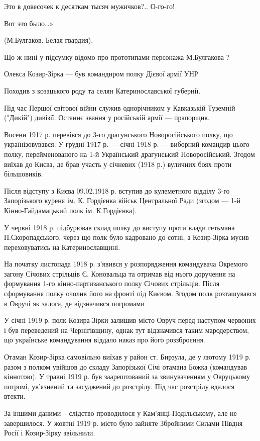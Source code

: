 Это в довесочек к десяткам тысяч мужичков?.. О-го-го!

Вот это было…»

(М.Булгаков. Белая гвардия).

Що ж нині у підсумку відомо про прототипами персонажа М.Булгакова ?

Олекса Козир-Зірка — був командиром полку Дієвої армії УНР.

Походив з козацького роду та селян Катеринославської губернії. 

Під час Першої світової війни служив однорічником у Кавказькій Туземній
("Дикій") дивізії. Останнє звання у російській армії — прапорщик.

Восени 1917 р. перевівся до 3-го драгунського Новоросійського полку, що
українізовувався. У грудні 1917 р. — січні 1918 р. — виборний командир цього
полку, перейменованого на 1-й Український драгунський Новоросійський. Згодом
виїхав до Києва, де брав участь у січневих (1918 р.) вуличних боях проти
більшовиків. 

Після відступу з Києва 09.02.1918 р. вступив до кулеметного відділу 3-го
Запорізького куреня ім. К. Гордієнка військ Центральної Ради (згодом — 1-й
Кінно-Гайдамацький полк ім. К.Гордієнка). 

У червні 1918 р. підбурював склад полку до виступу проти влади гетьмана
П.Скоропадського, через що полк було кадровано до сотні, а Козир-Зірка мусив
переховуватись на Катеринославщині. 

На початку листопада 1918 р. з'явився у розпорядження командувача Окремого
загону Січових стрільців Є. Коновальца та отримав від нього доручення на
формування 1-го кінно-партизанського полку Січових стрільців. Після
сформування полку очолив його на фронті під Києвом. Згодом полк розташувався
в Овручі як залога, де відзначився погромами

У січні 1919 р. полк Козира-Зірки залишив місто Овруч перед наступом червоних і
був переведений на Чернігівщину, однак тут відзначився таким мародерством, що
українське командування віддало наказ про його роззброєння. 

Отаман Козир-Зірка самовільно виїхав у район ст. Бирзула, де у лютому 1919 р.
разом з полком увійшов до складу Запорізької Січі отамана Божка (командував
кіннотою). У травні 1919 р. був заарештований за звинуваченням у Овруцькому
погромі, ув'язнений та засуджений до розстрілу. Під час розстрілу вдалося
втекти. 

За іншими даними – слідство проводилося у Кам'янці-Подільському, але не
завершилося. У жовтні 1919 р. місто було зайняте Збройними Силами Півдня
Росії і Козир-Зірку звільнили.


